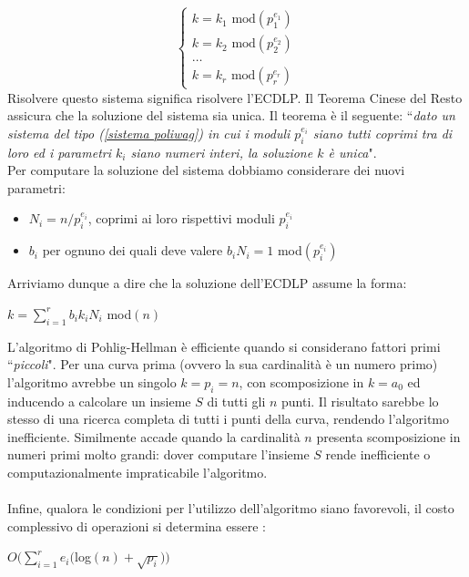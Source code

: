 \documentclass[a4paper,12pt]{tesiinfo}
\begin{document}
\begin{equation}
\begin{cases}
 k = k_1 \text{ mod}(p_1^{e_1})\\
 k = k_2 \text{ mod}(p_2^{e_2})\\
 \ldots\\
 k = k_r \text{ mod}(p_r^{e_r})
\end{cases}
\label{sistema poliwag}
\end{equation}
Risolvere questo sistema significa risolvere l'ECDLP. Il Teorema Cinese del Resto assicura che la soluzione del sistema sia unica. Il teorema \`e il seguente: ``\emph{dato un sistema del tipo (\ref{sistema poliwag}) in cui i moduli $p_i^{e_i}$ siano tutti coprimi tra di loro ed i parametri $k_i$ siano numeri interi, la soluzione $k$ \`e unica}". 
\\
Per computare la soluzione del sistema dobbiamo considerare dei nuovi parametri: 
\begin{itemize}
      \item $N_i = n \big /p_i^{e_i}$, coprimi ai loro rispettivi moduli $p_i^{e_i}$
      \item $b_i$ per ognuno dei quali deve valere $b_iN_i =1 $ mod$(p_i^{e_i})$
\end{itemize}
Arriviamo dunque a dire che la soluzione dell'ECDLP assume la forma:
\begin{center}
$k={\displaystyle \sum_{i=1}^r} b_ik_iN_i$ mod$(n)$
\end{center}
L'algoritmo di Pohlig-Hellman \`e efficiente quando si considerano fattori primi ``\textit{piccoli}". Per una curva prima (ovvero la sua cardinalit\`a \`e un numero primo) l'algoritmo avrebbe un singolo $k = p_i = n$, con scomposizione in $k = a_0$ ed inducendo a calcolare un insieme $S$ di tutti gli $n$ punti. Il risultato sarebbe lo stesso di una ricerca completa di tutti i punti della curva, rendendo l'algoritmo inefficiente. Similmente accade quando la cardinalit\`a $n$ presenta scomposizione in numeri primi molto grandi: dover computare l'insieme $S$ rende inefficiente o computazionalmente impraticabile l'algoritmo.
\\
\\
Infine, qualora le condizioni per l'utilizzo dell'algoritmo siano favorevoli, il costo complessivo di operazioni si determina essere \cite{libro 800 pagine}:
\begin{center}
$O \Big ({\displaystyle \sum_{i=1}^r }e_i($log$(n) +\sqrt{p_i} )\Big )$
\end{center}
%
%
%
%
%
%
%
%
%
%
%
\end{document}
